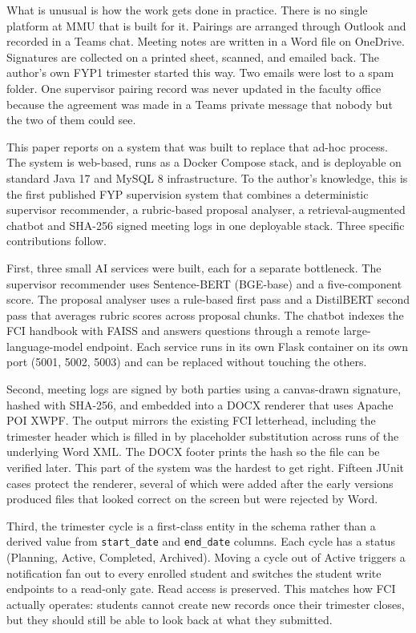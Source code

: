 \documentclass[conference,a4paper]{IEEEtran}
\begin{document}
What is unusual is how the work gets done in practice. There is no single platform at MMU that is built for it. Pairings are arranged through Outlook and recorded in a Teams chat. Meeting notes are written in a Word file on OneDrive. Signatures are collected on a printed sheet, scanned, and emailed back. The author's own FYP1 trimester started this way. Two emails were lost to a spam folder. One supervisor pairing record was never updated in the faculty office because the agreement was made in a Teams private message that nobody but the two of them could see.

This paper reports on a system that was built to replace that ad-hoc process. The system is web-based, runs as a Docker Compose stack, and is deployable on standard Java 17 and MySQL 8 infrastructure. To the author's knowledge, this is the first published FYP supervision system that combines a deterministic supervisor recommender, a rubric-based proposal analyser, a retrieval-augmented chatbot and SHA-256 signed meeting logs in one deployable stack. Three specific contributions follow.

First, three small AI services were built, each for a separate bottleneck. The supervisor recommender uses Sentence-BERT (BGE-base) and a five-component score. The proposal analyser uses a rule-based first pass and a DistilBERT second pass that averages rubric scores across proposal chunks. The chatbot indexes the FCI handbook with FAISS and answers questions through a remote large-language-model endpoint. Each service runs in its own Flask container on its own port (5001, 5002, 5003) and can be replaced without touching the others.

Second, meeting logs are signed by both parties using a canvas-drawn signature, hashed with SHA-256, and embedded into a DOCX renderer that uses Apache POI XWPF. The output mirrors the existing FCI letterhead, including the trimester header which is filled in by placeholder substitution across runs of the underlying Word XML. The DOCX footer prints the hash so the file can be verified later. This part of the system was the hardest to get right. Fifteen JUnit cases protect the renderer, several of which were added after the early versions produced files that looked correct on the screen but were rejected by Word.

Third, the trimester cycle is a first-class entity in the schema rather than a derived value from \texttt{start\_date} and \texttt{end\_date} columns. Each cycle has a status (Planning, Active, Completed, Archived). Moving a cycle out of Active triggers a notification fan out to every enrolled student and switches the student write endpoints to a read-only gate. Read access is preserved. This matches how FCI actually operates: students cannot create new records once their trimester closes, but they should still be able to look back at what they submitted.
\end{document}
